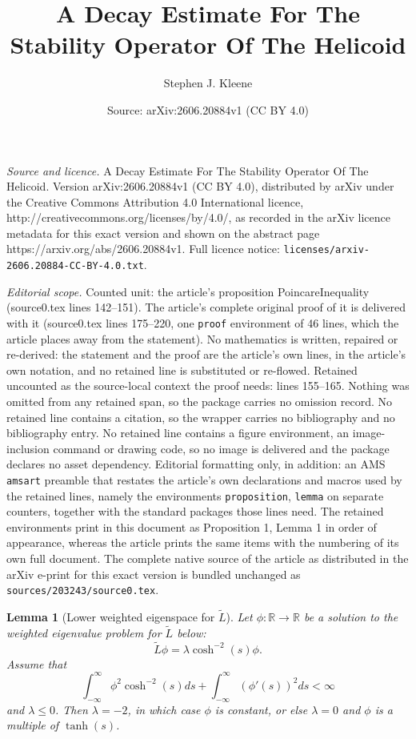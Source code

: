 \documentclass[10pt,a4paper]{amsart}
\title{A Decay Estimate For The Stability Operator Of The Helicoid}
\author{Stephen J. Kleene}
\date{Source: arXiv:2606.20884v1 (CC BY 4.0)}
\newtheorem{lemma}{Lemma}
\newcommand{\mb}{\mathbb}
\newcommand{\wt}{\widetilde}
\begin{document}
\maketitle

\noindent\emph{Source and licence.} A Decay Estimate For The Stability Operator Of The Helicoid. Version arXiv:2606.20884v1 (CC BY 4.0), distributed by arXiv under the Creative Commons Attribution 4.0 International licence, http://creativecommons.org/licenses/by/4.0/, as recorded in the arXiv licence metadata for this exact version and shown on the abstract page https://arxiv.org/abs/2606.20884v1. Full licence notice: \texttt{licenses/arxiv-2606.20884-CC-BY-4.0.txt}.\par\smallskip

\noindent\textit{Editorial scope.} Counted unit: the article's proposition PoincareInequality (source0.tex lines 142--151). The article's complete original proof of it is delivered with it (source0.tex lines 175--220, one \texttt{proof} environment of 46 lines, which the article places away from the statement). No mathematics is written, repaired or re-derived: the statement and the proof are the article's own lines, in the article's own notation, and no retained line is substituted or re-flowed.  Retained uncounted as the source-local context the proof needs: lines 155--165.  Nothing was omitted from any retained span, so the package carries no omission record.  No retained line contains a citation, so the wrapper carries no bibliography and no bibliography entry.  No retained line contains a figure environment, an image-inclusion command or drawing code, so no image is delivered and the package declares no asset dependency.  Editorial formatting only, in addition: an AMS \texttt{amsart} preamble that restates the article's own declarations and macros used by the retained lines, namely the environments \texttt{proposition}, \texttt{lemma} on separate counters, together with the standard packages those lines need.  The retained environments print in this document as Proposition 1, Lemma 1 in order of appearance, whereas the article prints the same items with the numbering of its own full document.  The complete native source of the article as distributed in the arXiv e-print for this exact version is bundled unchanged as \texttt{sources/203243/source0.tex}.
\begin{lemma}[Lower weighted eigenspace for $\wt{L}$]\label{LEigenvalues}
Let $\phi: \mb{R} \rightarrow \mb{R}$ be a solution to the weighted eigenvalue problem for $\wt{L}$ below:
\[
\wt{L} \phi = \lambda \cosh^{-2}(s)\phi.
\]
Assume that 
\[
\int_{-\infty}^\infty \phi^2 \cosh^{-2}(s) ds + \int_{-\infty}^\infty \left(\phi'(s)\right)^2 ds < \infty
\]
and   $\lambda \leq 0$. Then $\lambda = -2$, in which case $\phi$ is  constant, or else $\lambda = 0$ and $\phi$ is a multiple of $\tanh(s)$. 
 \end{lemma}
\end{document}
